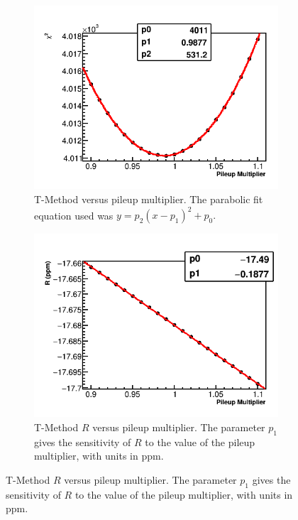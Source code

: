 \begin{figure}
\centering
    \begin{subfigure}[t]{0.45\textwidth}
        \centering
        \includegraphics[width=\textwidth]{TMethod_Chi2_Vs_PileupMultiplier_Canv}
        \caption{T-Method \chisq versus pileup multiplier. The parabolic fit equation used was $y = p_{2}(x - p_{1})^{2} + p_{0}.$}
    \end{subfigure}%
    \hspace{1cm}
    \begin{subfigure}[t]{0.45\textwidth}
        \centering
        \includegraphics[width=\textwidth]{TMethod_R_Vs_PileupMultiplier_Canv}
        \caption{T-Method $R$ versus pileup multiplier. The parameter $p_{1}$ gives the sensitivity of $R$ to the value of the pileup multiplier, with units in ppm.}
    \end{subfigure}


\end{figure}
